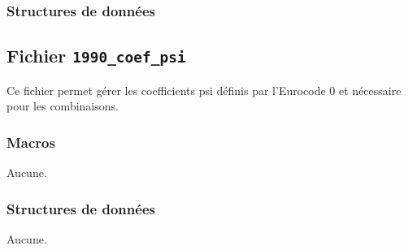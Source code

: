 \documentclass{article}
\begin{document}
\subsubsection{Structures de données}
























\subsection{Fichier {\texttt{1990\_coef\_psi}}}
Ce fichier permet gérer les coefficients psi définis par l'Eurocode 0 et nécessaire pour les combinaisons.
\subsubsection{Macros}
Aucune.
\subsubsection{Structures de données}
Aucune.


















\end{document}
